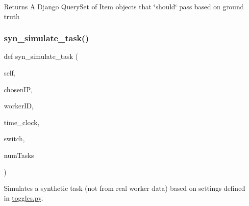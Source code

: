 \begin{DoxyReturn}{Returns}
A Django Query\+Set of Item objects that \char`\"{}should\char`\"{} pass based on ground truth 
\end{DoxyReturn}
\mbox{\label{classdynamicfilterapp_1_1test__simulations_1_1_simulation_test_a652b503c9374430264cac65df6c59eee}} 
\subsubsection{\texorpdfstring{syn\+\_\+simulate\+\_\+task()}{syn\_simulate\_task()}}
{\footnotesize\ttfamily def syn\+\_\+simulate\+\_\+task (\begin{DoxyParamCaption}\item[{}]{self,  }\item[{}]{chosen\+IP,  }\item[{}]{worker\+ID,  }\item[{}]{time\+\_\+clock,  }\item[{}]{switch,  }\item[{}]{num\+Tasks }\end{DoxyParamCaption})}



Simulates a synthetic task (not from real worker data) based on settings defined in \mbox{\hyperlink{toggles_8py}{toggles.\+py}}. 


